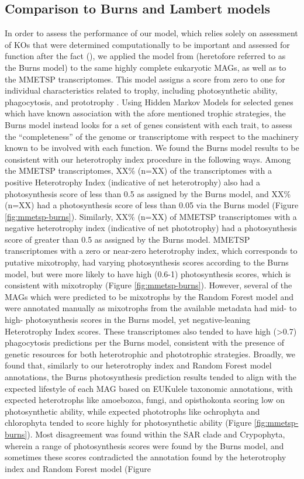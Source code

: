 \documentclass[12pt]{article}
\numberwithin{equation}{section}
\begin{document}
\subsection{Comparison to Burns and Lambert models}\label{burnssec}
In order to assess the performance of our model, which relies solely on assessment of KOs \citep{Kanehisa_2019} that were determined computationally to be important and assessed for function after the fact (), we applied the model from \cite{burns2018gene} (heretofore referred to as the Burns model) to the same highly complete eukaryotic MAGs, as well as to the MMETSP transcriptomes. This model assigns a score from zero to one for individual characteristics related to trophy, including photosynthetic ability, phagocytosis, and prototrophy \citep{burns2018gene}. Using Hidden Markov Models for selected genes which have known association with the afore mentioned trophic strategies, the Burns model instead looks for a set of genes consistent with each trait, to assess the ``completeness'' of the genome or transcriptome with respect to the machinery known to be involved with each function. We found the Burns model results to be consistent with our heterotrophy index procedure in the following ways. Among the MMETSP transcriptomes, XX\% (n=XX) of the transcriptomes with a positive Heterotrophy Index (indicative of net heterotrophy) also had a photosynthesis score of less than 0.5 as assigned by the Burns model, and XX\% (n=XX) had a photosynthesis score of less than 0.05 via the Burns model (Figure \ref{fig:mmetsp-burns}). Similarly, XX\% (n=XX)  of MMETSP transcriptomes with a negative heterotrophy index (indicative of net phototrophy) had a photosynthesis score of greater than 0.5 as assigned by the Burns model. MMETSP transcriptomes with a zero or near-zero heterotrophy index, which corresponds to putative mixotrophy, had varying photosynthesis scores according to the Burns model, but were more likely to have high (0.6-1) photosynthesis scores, which is consistent with mixotrophy (Figure \ref{fig:mmetsp-burns}). However, several of the MAGs which were predicted to be mixotrophs by the Random Forest model and were annotated manually as mixotrophs from the available metadata had mid- to high- photosynthesis scores in the Burns model, yet negative-leaning Heterotrophy Index scores. These transcriptomes also tended to have high (>0.7) phagocytosis predictions per the Burns model, consistent with the presence of genetic resources for both heterotrophic and phototrophic strategies. Broadly, we found that, similarly to our heterotrophy index and Random Forest model annotations, the Burns photosynthesis prediction results tended to align with the expected lifestyle of each MAG based on EUKulele \citep{Krinos2021EUKulele} taxonomic annotations, with expected heterotrophs like amoebozoa, fungi, and opisthokonta scoring low on photosynthetic ability, while expected phototrophs like ochrophyta and chlorophyta tended to score highly for photosynthetic ability (Figure \ref{fig:mmetsp-burns}). Most disagreement was found within the SAR clade and Crypophyta, wherein a range of photosynthesis scores were found by the Burns model, and sometimes these scores contradicted the annotation found by the heterotrophy index and Random Forest model (Figure 
\end{document}
